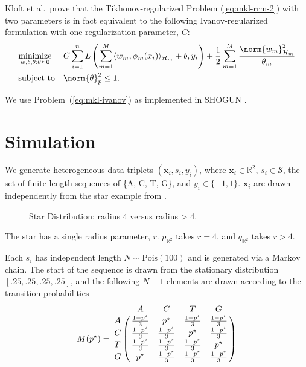 Kloft et al.\ prove that the Tikhonov-regularized Problem (\ref{eq:mkl-rrm-2})
with two parameters is in fact equivalent to the following Ivanov-regularized
formulation with one regularization parameter, $C$:
\begin{equation}
\label{eq:mkl-ivanov}
\begin{aligned}
& \underset{w, b, \theta : \theta \succeq 0}{\text{minimize}}
& & C \sum_{i=1}^n L \left (\sum_{m=1}^M \langle w_m, \phi_m(x_i) \rangle_{\mathcal{H}_m} + b, y_i
\right) + \frac{1}{2} \sum_{m=1}^M \frac{\norm{w_m}_{\mathcal{H}_m}^2}{\theta_m} \\
& \text{subject to}
& & \norm{\theta}_p^2 \leq 1.
\end{aligned}
\end{equation}

We use Problem~(\ref{eq:mkl-ivanov}) as implemented in SHOGUN \cite{sonnenburg2010shogun}.

\section{Simulation}
We generate heterogeneous data triplets $(\mathbf{x}_i, s_i, y_i)$, where
$\mathbf{x}_i \in \mathbb{R}^2$, $s_i \in \mathcal{S}$, the set of finite
length sequences of \{A, C, T, G\}, and $y_i \in \{-1, 1\}$.
$\mathbf{x}_i$ are drawn independently from the star example from \cite{sonnenburg2006large}.
\begin{figure}
  \begin{center}
    \resizebox{14.0cm}{!}{
      
    }
  \end{center}
\caption{Star Distribution: radius 4 versus radius > 4.}
\label{fig:star}
\end{figure}

The star has a single radius parameter, $r$.  $p_{\mathbb{R}^2}$ takes $r = 4$,
and $q_{\mathbb{R}^2}$ takes $r > 4$.

Each $s_i$ has independent length $N \sim \text{Pois}(100)$ and is generated via
a Markov chain.  The start of the sequence is drawn from the stationary distribution
$[.25, .25, .25, .25]$, and the following $N-1$ elements are drawn according to the transition
probabilities
\begin{equation*}
  M(p^{\star}) = \bordermatrix{
    ~ & A & C & T & G \cr
    A & \frac{1-p^{\star}}{3} & p^{\star} & \frac{1-p^{\star}}{3} & \frac{1-p^{\star}}{3} \cr
    C & \frac{1-p^{\star}}{3} & \frac{1-p^{\star}}{3} & p^{\star} & \frac{1-p^{\star}}{3} \cr
    T & \frac{1-p^{\star}}{3} & \frac{1-p^{\star}}{3} & \frac{1-p^{\star}}{3} & p^{\star} \cr
    G & p^{\star} & \frac{1-p^{\star}}{3} & \frac{1-p^{\star}}{3} & \frac{1-p^{\star}}{3} \cr
  }
\end{equation*}

